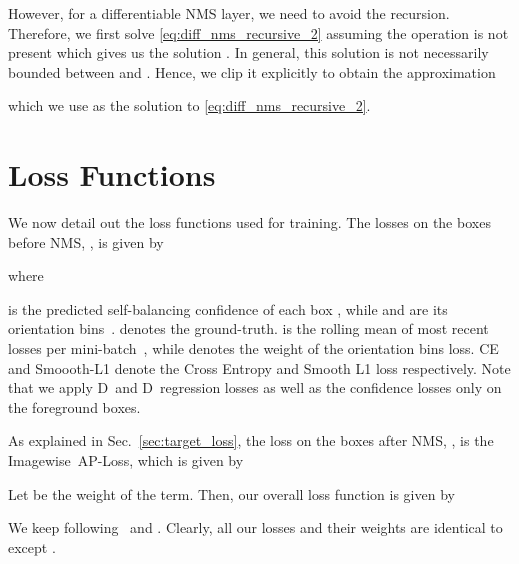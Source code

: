 \documentclass[final]{cvpr}
\newcommand{\myReferSection}[1]{Sec.~\ref{#1}}
\newcommand{\twoD}{D}
\newcommand{\threeD}{D}
\newcommand{\ap}{AP}
\newcommand{\aploss}{\ap-Loss}
\newcommand{\imageWise}{Imagewise}
\begin{document}
    However, for a differentiable NMS layer, we need to avoid the recursion. Therefore, we first solve \eqref{eq:diff_nms_recursive_2} assuming the  operation is not present which gives us the solution . In general, this solution is not necessarily bounded between  and . Hence, we clip it explicitly to obtain the approximation
    
    which we use as the solution to \eqref{eq:diff_nms_recursive_2}.


\section{Loss Functions}\label{sec:appendix_loss}
    We now detail out the loss functions used for training.
    The losses on the boxes before NMS, , is given by~\cite{brazil2020kinematic}
    
    where
    
     is the predicted self-balancing confidence of each box , while  and  are its orientation bins~\cite{brazil2020kinematic}. 
     denotes the ground-truth.
     is the rolling mean of most recent  losses per mini-batch~\cite{brazil2020kinematic}, while  denotes the weight of the orientation bins loss.
    CE and Smoooth-L1 denote the Cross Entropy and Smooth L1 loss respectively.
    Note that we apply \twoD~and \threeD~regression losses as well as the confidence losses only on the foreground boxes.
    
    As explained in \myReferSection{sec:target_loss}, the loss on the boxes after NMS, , is the \imageWise~\aploss, which is given by
    
    
    Let  be the weight of the  term.
    Then, our overall loss function is given by 
    
    We keep  following~\cite{brazil2020kinematic}
    and . 
    Clearly, all our losses and their weights are identical to~\cite{brazil2020kinematic} except .
\end{document}
